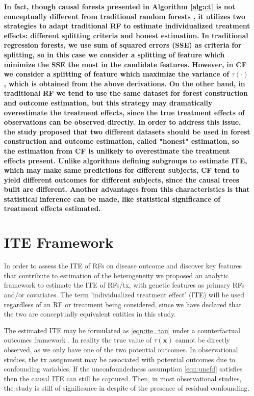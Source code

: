     \textbf{In fact, though causal forests presented in Algorithm \ref{alg:ct} is not conceptually different from traditional random forests \cite{breiman2001random}, it utilizes two strategies to adapt traditional RF to estimate individualized treatment effects: different splitting criteria and honest estimation. In traditional regression forests, we use sum of squared errors (SSE) as criteria for splitting, so in this case we consider a splitting of feature which minimize the SSE the most in the candidate features. However, in CF we consider a splitting of feature which maximize the variance of $\tau(\cdot)$ \cite{wager2018estimation}, which is obtained from the above derivations. On the other hand, in traditional RF we tend to use the same dataset for forest construction and outcome estimation, but this strategy may dramatically overestimate the treatment effects, since the true treatment effects of observations can be observed directly. In order to address this issue, the study \cite{wager2018estimation} proposed that two different datasets should be used in forest construction and outcome estimation, called "honest" estimation, so the estimation from CF is unlikely to overestimate the treatment effects present. Unlike algorithms defining subgroups to estimate ITE, which may make same predictions for different subjects, CF tend to yield different outcomes for different subjects, since the causal trees built are different. Another advantages from this characteristics is that statistical inference can be made, like statistical significance of treatment effects estimated.}

\section{ITE Framework}
\label{sec:ite_model}
  In order to assess the ITE of RFs on disease outcome and discover key features that contribute to estimation of the heterogeneity we proposed an analytic framework to estimate the ITE of RFs/tx, with genetic features as primary RFs and/or covariates. The term 'individualized treatment effect' (ITE) will be used regardless of an RF or treatment being considered, since we have declared that the two are conceptually equivalent entities in this study. 

  The estimated ITE may be formulated as \ref{eqn:ite_tau} under a counterfactual outcomes framework \cite{rubin2005causal}. In reality the true value of $\tau(\mathbf{x})$ cannot be directly observed, as we only have one of the two potential outcomes. In observational studies, the tx assignment may be associated with potential outcomes due to confounding variables. If the unconfoundedness assumption \ref{eqn:uncfd} satisfies then the causal ITE can still be captured. Then, in most observational studies, the study is still of significance in despite of the presence of residual confounding. 
  

